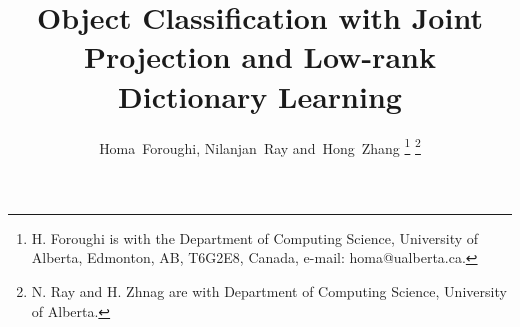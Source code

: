 \documentclass[journal]{IEEEtran}
\begin{document}
\title{Object Classification with Joint Projection and Low-rank Dictionary Learning}

\author{Homa~Foroughi, Nilanjan~Ray and~Hong~Zhang 
\thanks{H. Foroughi is with the Department
of Computing Science, University of Alberta, Edmonton,
AB, T6G2E8, Canada, e-mail: homa@ualberta.ca.}%
\thanks{N. Ray and H. Zhnag are with Department of Computing Science, University of Alberta.}}



\maketitle
\end{document}
